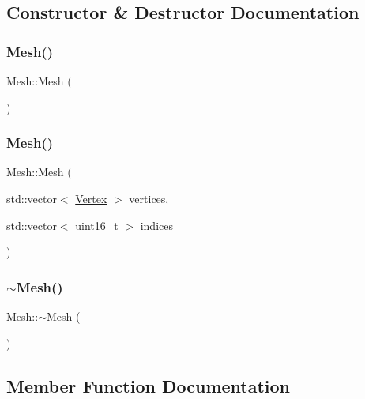 \subsection{Constructor \& Destructor Documentation}
\mbox{\label{class_mesh_a2af137f1571af89172b9c102302c416b}} 
\subsubsection{\texorpdfstring{Mesh()}{Mesh()}\hspace{0.1cm}{\footnotesize\ttfamily [1/2]}}
{\footnotesize\ttfamily Mesh\+::\+Mesh (\begin{DoxyParamCaption}{ }\end{DoxyParamCaption})}

\mbox{\label{class_mesh_a64cf0a605d5513269cf9135cd5dc12d8}} 
\subsubsection{\texorpdfstring{Mesh()}{Mesh()}\hspace{0.1cm}{\footnotesize\ttfamily [2/2]}}
{\footnotesize\ttfamily Mesh\+::\+Mesh (\begin{DoxyParamCaption}\item[{std\+::vector$<$ \hyperlink{struct_vertex}{Vertex} $>$}]{vertices,  }\item[{std\+::vector$<$ uint16\+\_\+t $>$}]{indices }\end{DoxyParamCaption})}

\mbox{\label{class_mesh_a5efe4da1a4c0971cfb037bd70304c303}} 
\subsubsection{\texorpdfstring{$\sim$\+Mesh()}{~Mesh()}}
{\footnotesize\ttfamily Mesh\+::$\sim$\+Mesh (\begin{DoxyParamCaption}{ }\end{DoxyParamCaption})}



\subsection{Member Function Documentation}
\mbox{\label{class_mesh_a78f343a657c5cd0db0d8c1a7033371bf}} 
